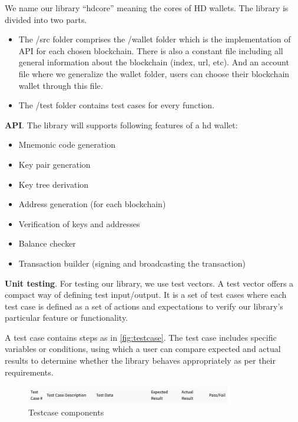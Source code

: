 We name our library “hdcore” meaning the cores of HD wallets. The library is divided into two parts.

\begin{itemize}
    \item The /src folder comprises the /wallet folder which is the implementation of API for each chosen blockchain. There is also a constant file including all general information about the blockchain (index, url, etc). And an account file where we generalize the wallet folder, users can choose their blockchain wallet through this file.
    \item The /test folder contains test cases for every function.
\end{itemize}

\bigskip
{\textbf{API}}. The library will supports following features of a hd wallet:

\begin{itemize}
    \item Mnemonic code generation
    \item Key pair generation
    \item Key tree derivation
    \item Address generation (for each blockchain)
    \item Verification of keys and addresses
    \item Balance checker
    \item Transaction builder (signing and broadcasting the transaction)
\end{itemize}


\bigskip
{\textbf{Unit testing}}. For testing our library, we use test vectors. A test vector offers a compact way of defining test input/output. It is a set of test cases where each test case is defined as a set of actions and expectations to verify our library's particular feature or functionality.

A test case contains steps as in \autoref{fig:testcase}. The test case includes specific variables or conditions, using which a user can compare expected and actual results to determine whether the library behaves appropriately as per their requirements.

\begin{figure}[!ht]
    \centering
    \includegraphics[width=0.8\textwidth]{images/testcase.png}
    \caption[Testcase components]{Testcase components}
    \label{fig:testcase}
\end{figure}

